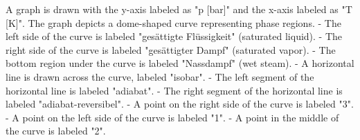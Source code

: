 A graph is drawn with the y-axis labeled as "p [bar]" and the x-axis labeled as "T [K]". The graph depicts a dome-shaped curve representing phase regions.  
- The left side of the curve is labeled "gesättigte Flüssigkeit" (saturated liquid).  
- The right side of the curve is labeled "gesättigter Dampf" (saturated vapor).  
- The bottom region under the curve is labeled "Nassdampf" (wet steam).  
- A horizontal line is drawn across the curve, labeled "isobar".  
- The left segment of the horizontal line is labeled "adiabat".  
- The right segment of the horizontal line is labeled "adiabat-reversibel".  
- A point on the right side of the curve is labeled "3".  
- A point on the left side of the curve is labeled "1".  
- A point in the middle of the curve is labeled "2".
